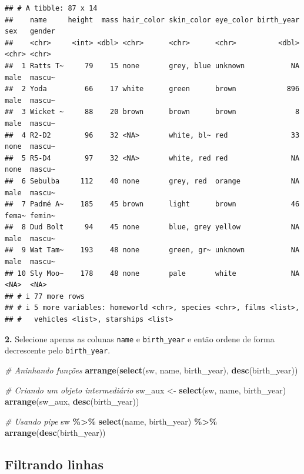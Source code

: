 \documentclass[
]{book}
\newenvironment{Shaded}{\begin{snugshade}}{\end{snugshade}}
\newcommand{\CommentTok}[1]{\textcolor[rgb]{0.56,0.35,0.01}{\textit{#1}}}
\newcommand{\FunctionTok}[1]{\textcolor[rgb]{0.13,0.29,0.53}{\textbf{#1}}}
\newcommand{\NormalTok}[1]{#1}
\newcommand{\OtherTok}[1]{\textcolor[rgb]{0.56,0.35,0.01}{#1}}
\newcommand{\SpecialCharTok}[1]{\textcolor[rgb]{0.81,0.36,0.00}{\textbf{#1}}}
\begin{document}
\begin{verbatim}
## # A tibble: 87 x 14
##    name     height  mass hair_color skin_color eye_color birth_year sex   gender
##    <chr>     <int> <dbl> <chr>      <chr>      <chr>          <dbl> <chr> <chr> 
##  1 Ratts T~     79    15 none       grey, blue unknown           NA male  mascu~
##  2 Yoda         66    17 white      green      brown            896 male  mascu~
##  3 Wicket ~     88    20 brown      brown      brown              8 male  mascu~
##  4 R2-D2        96    32 <NA>       white, bl~ red               33 none  mascu~
##  5 R5-D4        97    32 <NA>       white, red red               NA none  mascu~
##  6 Sebulba     112    40 none       grey, red  orange            NA male  mascu~
##  7 Padmé A~    185    45 brown      light      brown             46 fema~ femin~
##  8 Dud Bolt     94    45 none       blue, grey yellow            NA male  mascu~
##  9 Wat Tam~    193    48 none       green, gr~ unknown           NA male  mascu~
## 10 Sly Moo~    178    48 none       pale       white             NA <NA>  <NA>  
## # i 77 more rows
## # i 5 more variables: homeworld <chr>, species <chr>, films <list>,
## #   vehicles <list>, starships <list>
\end{verbatim}

\textbf{2.} Selecione apenas as colunas \texttt{name} e \texttt{birth\_year} e então ordene
de forma decrescente pelo \texttt{birth\_year}.

\begin{Shaded}
\begin{Highlighting}[]
\CommentTok{\# Aninhando funções}
\FunctionTok{arrange}\NormalTok{(}\FunctionTok{select}\NormalTok{(sw, name, birth\_year), }\FunctionTok{desc}\NormalTok{(birth\_year))}

\CommentTok{\# Criando um objeto intermediário}
\NormalTok{sw\_aux }\OtherTok{\textless{}{-}} \FunctionTok{select}\NormalTok{(sw, name, birth\_year)}
\FunctionTok{arrange}\NormalTok{(sw\_aux, }\FunctionTok{desc}\NormalTok{(birth\_year))}

\CommentTok{\# Usando pipe}
\NormalTok{sw }\SpecialCharTok{\%\textgreater{}\%} 
  \FunctionTok{select}\NormalTok{(name, birth\_year) }\SpecialCharTok{\%\textgreater{}\%}
  \FunctionTok{arrange}\NormalTok{(}\FunctionTok{desc}\NormalTok{(birth\_year))}
\end{Highlighting}
\end{Shaded}

\subsection{Filtrando linhas}\label{filtrando-linhas}
\end{document}
